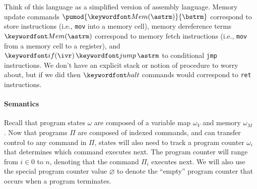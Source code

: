 \documentclass[11pt,twoside]{scrartcl}
\begin{document}
Think of this language as a simplified version of assembly language. Memory update commands $\pumod{\pderef{\astrm}}{\bstrm}$ correspond to store instructions (i.e., \verb'mov' into a memory cell), memory dereference terms $\pderef{\astrm}$ correspond to memory fetch instructions (i.e., \verb'mov' from a memory cell to a register), and $\pifjump{\ivr}{\astrm}$ to conditional \verb'jmp' instructions. We don't have an explicit stack or notion of procedure to worry about, but if we did then $\phalt$ commands would correspond to \verb'ret' instructions.

\paragraph{Semantics}
Recall that program states $\omega$ are composed of a variable map $\omega_V$ and memory $\omega_M$. Now that programs $\Pi$ are composed of indexed commands, and can transfer control to any command in $\Pi$, states will also need to track a program counter $\omega_i$ that determines which command executes next. The program counter will range from $i \in 0$ to $n$, denoting that the command $\Pi_i$ executes next. We will also use the special program counter value $\varnothing$ to denote the ``empty'' program counter that occurs when a program terminates.
\end{document}
